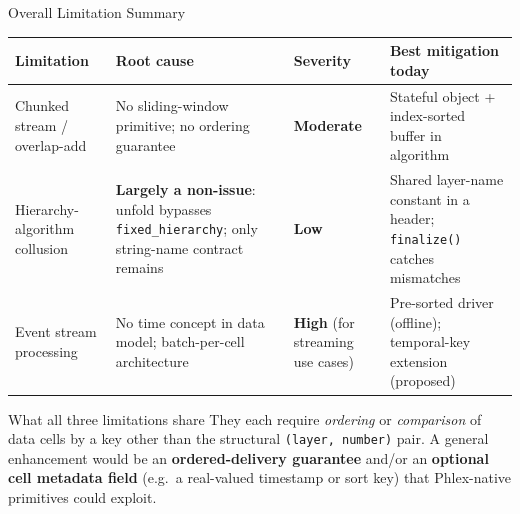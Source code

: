 \documentclass[aspectratio=169,10pt]{beamer}
\newcommand{\good}[1]{\textcolor{green!50!black}{\textbf{#1}}}
\newcommand{\bad}[1]{\textcolor{red!70!black}{\textbf{#1}}}
\newcommand{\warn}[1]{\textcolor{orange!80!black}{\textbf{#1}}}
\newcommand{\corr}[1]{\colorbox{yellow!30}{\textbf{#1}}}
\newcommand{\code}[1]{\texttt{\small #1}}
\begin{document}
\begin{frame}{Overall Limitation Summary}
  \small
  \begin{tabular}{@{}p{}p{}p{}p{}@{}}
    \toprule
    \textbf{Limitation} & \textbf{Root cause} & \textbf{Severity} & \textbf{Best mitigation today} \\
    \midrule
    Chunked stream / overlap-add
    & No sliding-window primitive; no ordering guarantee
    & \warn{Moderate}
    & Stateful object + index-sorted buffer in algorithm \\[4pt]
    Hierarchy-algorithm collusion
    & \corr{Largely a non-issue}: unfold bypasses \code{fixed\_hierarchy}; only string-name contract remains
    & \good{Low}
    & Shared layer-name constant in a header; \code{finalize()} catches mismatches \\[4pt]
    Event stream processing
    & No time concept in data model; batch-per-cell architecture
    & \bad{High} (for streaming use cases)
    & Pre-sorted driver (offline); temporal-key extension (proposed) \\
    \bottomrule
  \end{tabular}

  \bigskip
  \begin{block}{What all three limitations share}
    They each require \emph{ordering} or \emph{comparison} of data cells
    by a key other than the structural \code{(layer, number)} pair.
    A general enhancement would be an \textbf{ordered-delivery guarantee}
    and/or an \textbf{optional cell metadata field} (e.g.\ a real-valued
    timestamp or sort key) that Phlex-native primitives could exploit.
  \end{block}
\end{frame}
\end{document}
